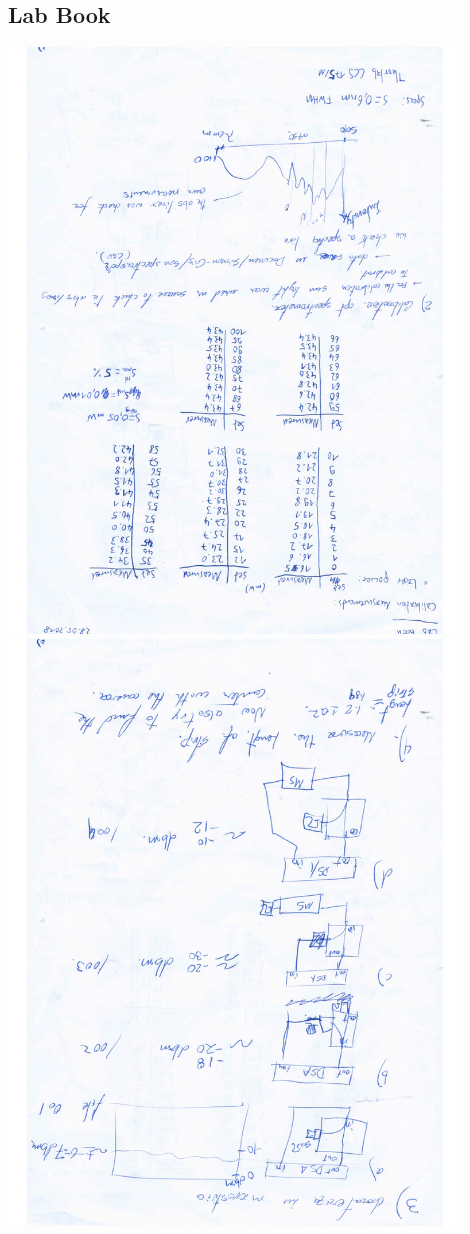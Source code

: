 \subsection{Lab Book}
\centering
\includegraphics[width=0.9\textwidth,angle=180]{../labbook/labbook-1.pdf}
\includegraphics[width=0.9\textwidth,angle=180]{../labbook/labbook-2.pdf}
